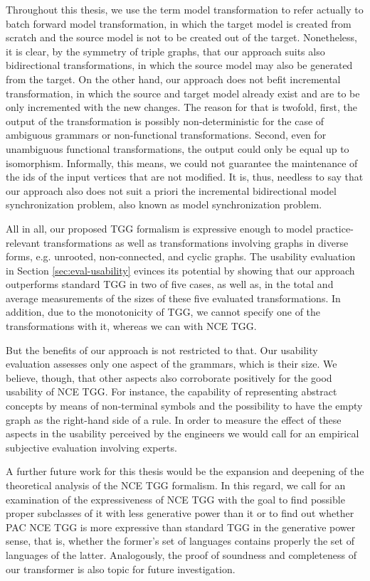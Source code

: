 Throughout this thesis, we use the term model transformation to refer actually to batch forward model transformation, in which the target model is created from scratch and the source model is not to be created out of the target. Nonetheless, it is clear, by the symmetry of triple graphs, that our approach suits also bidirectional transformations, in which the source model may also be generated from the target. On the other hand, our approach does not befit incremental transformation, in which the source and target model already exist and are to be only incremented with the new changes. The reason for that is twofold, first, the output of the transformation is possibly non-deterministic for the case of ambiguous grammars or non-functional transformations. Second, even for unambiguous functional transformations, the output could only be equal up to isomorphism. Informally, this means, we could not guarantee the maintenance of the ids of the input vertices that are not modified. It is, thus, needless to say that our approach also does not suit a priori the incremental bidirectional model synchronization problem, also known as model synchronization problem.

All in all, our proposed TGG formalism is expressive enough to model practice-relevant transformations as well as transformations involving graphs in diverse forms, e.g. unrooted, non-connected, and cyclic graphs. The usability evaluation in Section \ref{sec:eval-usability} evinces its potential by showing that our approach outperforms standard TGG in two of five cases, as well as, in the total and average measurements of the sizes of these five evaluated transformations. In addition, due to the monotonicity of TGG, we cannot specify one of the transformations with it, whereas we can with NCE TGG.

But the benefits of our approach is not restricted to that. Our usability evaluation assesses only one aspect of the grammars, which is their size. We believe, though, that other aspects also corroborate positively for the good usability of NCE TGG. For instance, the capability of representing abstract concepts by means of non-terminal symbols and the possibility to have the empty graph as the right-hand side of a rule. In order to measure the effect of these aspects in the usability perceived by the engineers we would call for an empirical subjective evaluation involving experts.

A further future work for this thesis would be the expansion and deepening of the theoretical analysis of the NCE TGG formalism. In this regard, we call for an examination of the expressiveness of NCE TGG with the goal to find possible proper subclasses of it with less generative power than it or to find out whether PAC NCE TGG is more expressive than standard TGG in the generative power sense, that is, whether the former's set of languages contains properly the set of languages of the latter. Analogously, the proof of soundness and completeness of our transformer is also topic for future investigation.

